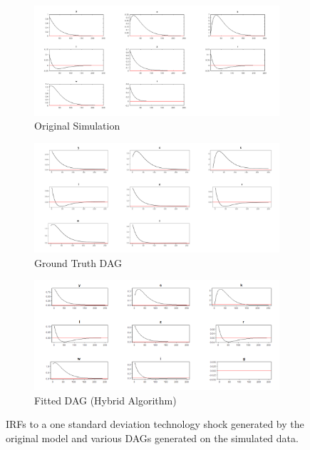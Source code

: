 \documentclass{article}
\begin{document}
\begin{figure}

  \centering
  \begin{subfigure}{0.8\textwidth}
    \centering
    \includegraphics[width=\linewidth]{images/rbc_sim_irf.png} 
    \caption{Original Simulation}
    \label{simirf}
  \end{subfigure}
  \begin{subfigure}{0.8\textwidth}
    \centering  
    \includegraphics[width=\linewidth]{images/rbc_true_dag_irfs.png}
    \caption{Ground Truth DAG}
    \label{gtirf}
  \end{subfigure}
  \begin{subfigure}{0.8\textwidth}
    \centering  
    \includegraphics[width=\linewidth]{images/rbc_hybrid_irfs.png}
    \caption{Fitted DAG (Hybrid Algorithm)}
    \label{hirf}
  \end{subfigure}

  \caption{IRFs to a one standard deviation technology shock generated by the original model and various DAGs generated on the simulated data.}
  \label{dag10}
\end{figure}
\end{document}
